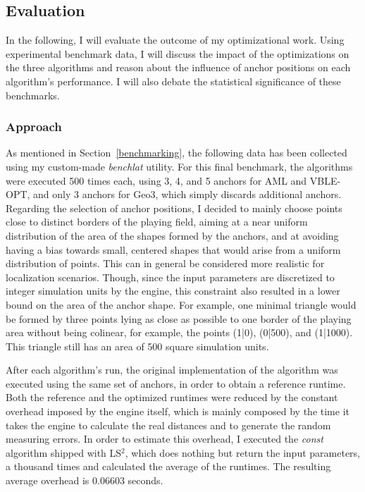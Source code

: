 \subsection{Evaluation}
\label{Evaluation}

In the following, I will evaluate the outcome of my optimizational work. Using experimental benchmark data, I will discuss the impact of the optimizations on the three algorithms and reason about the influence of anchor positions on each algorithm's performance. I will also debate the statistical significance of these benchmarks.

\subsubsection{Approach}
\label{eval_approach}
As mentioned in Section~\ref{benchmarking}, the following data has been collected using my custom-made \emph{benchlat} utility. For this final benchmark, the algorithms were executed 500 times each, using 3, 4, and 5 anchors for AML and VBLE-OPT, and only 3 anchors for Geo3, which simply discards additional anchors. Regarding the selection of anchor positions, I decided to mainly choose points close to distinct borders of the playing field, aiming at a near uniform distribution of the area of the shapes formed by the anchors, and at avoiding having a bias towards small, centered shapes that would arise from a uniform distribution of points. This can in general be considered more realistic for localization scenarios. Though, since the input parameters are discretized to integer simulation units by the engine, this constraint also resulted in a lower bound on the area of the anchor shape. For example, one minimal triangle would be formed by three points lying as close as possible to one border of the playing area without being colinear, for example, the points (1|0), (0|500), and (1|1000). This triangle still has an area of 500 square simulation units.

After each algorithm's run, the original implementation of the algorithm was executed using the same set of anchors, in order to obtain a reference runtime. Both the reference and the optimized runtimes were reduced by the constant overhead imposed by the engine itself, which is mainly composed by the time it takes the engine to calculate the real distances and to generate the random measuring errors. In order to estimate this overhead, I executed the \emph{const} algorithm shipped with LS$^{2}$, which does nothing but return the input parameters, a thousand times and calculated the average of the runtimes. The resulting average overhead is 0.06603 seconds. 

